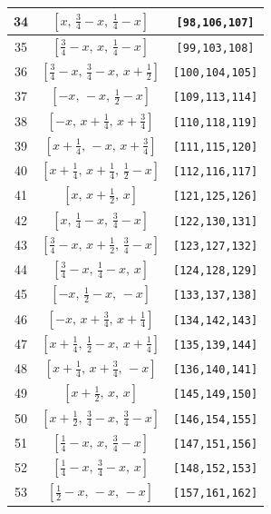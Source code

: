 \documentclass[fleqn,8pt]{jsarticle}
\begin{document}
\begin{longtable}{ccc}
34 & $\left[ x,\, \frac{3}{4} - x,\, \frac{1}{4} - x \right]$ & {\tt [98,106,107]} \\ \hline
35 & $\left[ \frac{3}{4} - x,\, x,\, \frac{1}{4} - x \right]$ & {\tt [99,103,108]} \\ \hline
36 & $\left[ \frac{3}{4} - x,\, \frac{3}{4} - x,\, x + \frac{1}{2} \right]$ & {\tt [100,104,105]} \\ \hline
37 & $\left[ - x,\, - x,\, \frac{1}{2} - x \right]$ & {\tt [109,113,114]} \\ \hline
38 & $\left[ - x,\, x + \frac{1}{4},\, x + \frac{3}{4} \right]$ & {\tt [110,118,119]} \\ \hline
39 & $\left[ x + \frac{1}{4},\, - x,\, x + \frac{3}{4} \right]$ & {\tt [111,115,120]} \\ \hline
40 & $\left[ x + \frac{1}{4},\, x + \frac{1}{4},\, \frac{1}{2} - x \right]$ & {\tt [112,116,117]} \\ \hline
41 & $\left[ x,\, x + \frac{1}{2},\, x \right]$ & {\tt [121,125,126]} \\ \hline
42 & $\left[ x,\, \frac{1}{4} - x,\, \frac{3}{4} - x \right]$ & {\tt [122,130,131]} \\ \hline
43 & $\left[ \frac{3}{4} - x,\, x + \frac{1}{2},\, \frac{3}{4} - x \right]$ & {\tt [123,127,132]} \\ \hline
44 & $\left[ \frac{3}{4} - x,\, \frac{1}{4} - x,\, x \right]$ & {\tt [124,128,129]} \\ \hline
45 & $\left[ - x,\, \frac{1}{2} - x,\, - x \right]$ & {\tt [133,137,138]} \\ \hline
46 & $\left[ - x,\, x + \frac{3}{4},\, x + \frac{1}{4} \right]$ & {\tt [134,142,143]} \\ \hline
47 & $\left[ x + \frac{1}{4},\, \frac{1}{2} - x,\, x + \frac{1}{4} \right]$ & {\tt [135,139,144]} \\ \hline
48 & $\left[ x + \frac{1}{4},\, x + \frac{3}{4},\, - x \right]$ & {\tt [136,140,141]} \\ \hline
49 & $\left[ x + \frac{1}{2},\, x,\, x \right]$ & {\tt [145,149,150]} \\ \hline
50 & $\left[ x + \frac{1}{2},\, \frac{3}{4} - x,\, \frac{3}{4} - x \right]$ & {\tt [146,154,155]} \\ \hline
51 & $\left[ \frac{1}{4} - x,\, x,\, \frac{3}{4} - x \right]$ & {\tt [147,151,156]} \\ \hline
52 & $\left[ \frac{1}{4} - x,\, \frac{3}{4} - x,\, x \right]$ & {\tt [148,152,153]} \\ \hline
53 & $\left[ \frac{1}{2} - x,\, - x,\, - x \right]$ & {\tt [157,161,162]} \\ \hline

\end{longtable}
\end{document}
